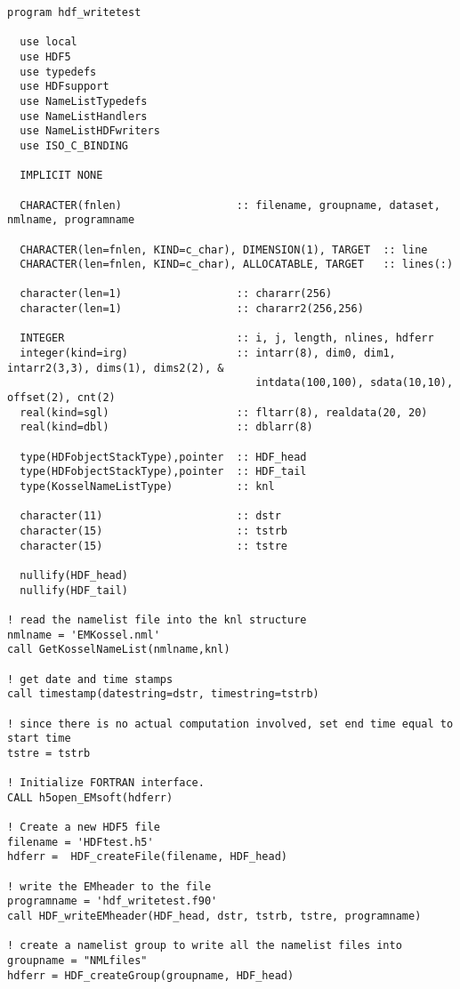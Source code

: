 \documentclass[DIV=calc, paper=letter, fontsize=11pt]{scrartcl}	 %
\begin{document}
{\small\begin{verbatim}
program hdf_writetest

  use local
  use HDF5
  use typedefs
  use HDFsupport
  use NameListTypedefs
  use NameListHandlers
  use NameListHDFwriters
  use ISO_C_BINDING
  
  IMPLICIT NONE

  CHARACTER(fnlen)                  :: filename, groupname, dataset, nmlname, programname
  
  CHARACTER(len=fnlen, KIND=c_char), DIMENSION(1), TARGET  :: line 
  CHARACTER(len=fnlen, KIND=c_char), ALLOCATABLE, TARGET   :: lines(:) 

  character(len=1)                  :: chararr(256)
  character(len=1)                  :: chararr2(256,256)

  INTEGER                           :: i, j, length, nlines, hdferr
  integer(kind=irg)                 :: intarr(8), dim0, dim1, intarr2(3,3), dims(1), dims2(2), &
                                       intdata(100,100), sdata(10,10), offset(2), cnt(2)
  real(kind=sgl)                    :: fltarr(8), realdata(20, 20)
  real(kind=dbl)                    :: dblarr(8)

  type(HDFobjectStackType),pointer  :: HDF_head
  type(HDFobjectStackType),pointer  :: HDF_tail
  type(KosselNameListType)          :: knl

  character(11)                     :: dstr
  character(15)                     :: tstrb
  character(15)                     :: tstre

  nullify(HDF_head)
  nullify(HDF_tail)

! read the namelist file into the knl structure
nmlname = 'EMKossel.nml'
call GetKosselNameList(nmlname,knl)

! get date and time stamps
call timestamp(datestring=dstr, timestring=tstrb)

! since there is no actual computation involved, set end time equal to start time
tstre = tstrb

! Initialize FORTRAN interface.
CALL h5open_EMsoft(hdferr)

! Create a new HDF5 file
filename = 'HDFtest.h5'
hdferr =  HDF_createFile(filename, HDF_head)

! write the EMheader to the file
programname = 'hdf_writetest.f90'
call HDF_writeEMheader(HDF_head, dstr, tstrb, tstre, programname)

! create a namelist group to write all the namelist files into
groupname = "NMLfiles"
hdferr = HDF_createGroup(groupname, HDF_head)


\end{verbatim}}
\end{document}
